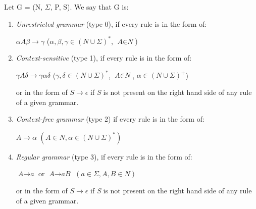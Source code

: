 \begin{definition}
    Let G = (N, $\Sigma$, P, S). We say that G is:
\end{definition}
\begin{enumerate}
    \item \textit{Unrestricted grammar} (type 0), if every rule is in the form of:
    
    \centerline{$\alpha\textit{A}\beta \rightarrow \gamma$ ($\alpha, \beta, \gamma \in (\textit{N} \cup \Sigma)^*$, $\textit{A} \in \textit{N}$)}
    \item \textit{Context-sensitive} (type 1), if every rule is in the form of:

    \centerline{$\gamma\textit{A}\delta \rightarrow \gamma\alpha\delta$ ($\gamma, \delta \in (\textit{N} \cup \Sigma)^*$, $\textit{A} \in \textit{N}$, $\alpha \in (\textit{N} \cup \Sigma)^+$)}
    or in the form of $\textit{S} \rightarrow \epsilon$ if \textit{S} is not present on the right hand side of any rule of a given grammar.
    \item \textit{Context-free grammar} (type 2) if every rule is in the form of:

    \centerline{$\textit{A} \rightarrow \alpha$ $(\textit{A} \in \textit{N}, \alpha \in (N \cup \Sigma)^*)$}
    \item \textit{Regular grammar} (type 3), if every rule is in the form of:

    \centerline{$\textit{A} \rightarrow \textit{a}$ or $\textit{A} \rightarrow \textit{aB}$ $(\textit{a} \in \Sigma, \textit{A}, \textit{B} \in \textit{N})$}
    or in the form of $\textit{S} \rightarrow \epsilon$ if \textit{S} is not present on the right hand side of any rule of a given grammar.
\end{enumerate}

